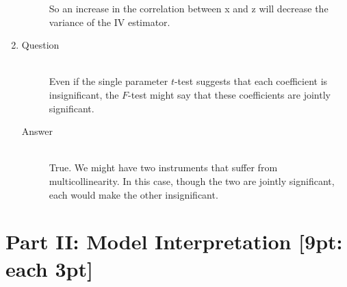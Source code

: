 \documentclass{article}
\begin{document}
\begin{enumerate}
\begin{description}
    So an increase in the correlation between x and z will decrease the variance of the IV estimator.
  \end{description}
  
  \item
  \begin{description}
    \item[Question] \hfill \\
    Even if the single parameter \(t\)-test suggests that each coefficient is insignificant, the \(F\)-test might say that these coefficients are jointly significant.
    \item[Answer] \hfill \\
    True. We might have two instruments that suffer from multicollinearity. In this case, though the two are jointly significant, each would make the other insignificant.
  \end{description}
\end{enumerate}
  
\section{Part II: Model Interpretation [9pt: each 3pt]}
\end{document}
